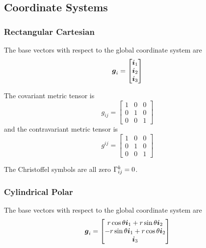 \subsection{Coordinate Systems}

\subsubsection{Rectangular Cartesian}

The base vectors with respect to the global coordinate system are
\begin{equation}
  \vect{g}_{i}=\begin{bmatrix} 
    \vect{i}_{1} \\ 
    \vect{i}_{2} \\
    \vect{i}_{3} 
  \end{bmatrix}
\end{equation}

The covariant metric tensor is
\begin{equation}
  g_{ij}=\begin{bmatrix}
    1 & 0 & 0 \\
    0 & 1 & 0 \\
    0 & 0 & 1
  \end{bmatrix}
\end{equation}
and the contravariant metric tensor is
\begin{equation}
  g^{ij}=\begin{bmatrix}
    1 & 0 & 0 \\
    0 & 1 & 0 \\
    0 & 0 & 1
  \end{bmatrix}
\end{equation}

The Christoffel symbols are all zero \ie $ \Gamma_{ij}^{k} =0$.

\subsubsection{Cylindrical Polar}

The base vectors with respect to the global coordinate system are
\begin{equation}
  \vect{g}_{i}=\begin{bmatrix} 
    r\cos\theta\vect{i}_{1} + r\sin\theta\vect{i}_{2} \\ 
    -r\sin\theta\vect{i}_{1}+ r\cos\theta\vect{i}_{2} \\
    \vect{i}_{3} 
  \end{bmatrix}
\end{equation}

